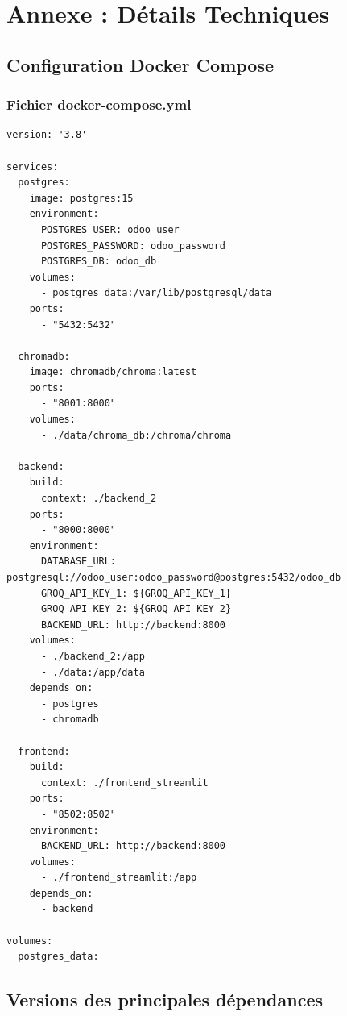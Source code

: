 
\chapter*{Annexe : Détails Techniques}

\section{Configuration Docker Compose}

\subsection{Fichier docker-compose.yml}
\begin{verbatim}
version: '3.8'

services:
  postgres:
    image: postgres:15
    environment:
      POSTGRES_USER: odoo_user
      POSTGRES_PASSWORD: odoo_password
      POSTGRES_DB: odoo_db
    volumes:
      - postgres_data:/var/lib/postgresql/data
    ports:
      - "5432:5432"

  chromadb:
    image: chromadb/chroma:latest
    ports:
      - "8001:8000"
    volumes:
      - ./data/chroma_db:/chroma/chroma

  backend:
    build:
      context: ./backend_2
    ports:
      - "8000:8000"
    environment:
      DATABASE_URL: postgresql://odoo_user:odoo_password@postgres:5432/odoo_db
      GROQ_API_KEY_1: ${GROQ_API_KEY_1}
      GROQ_API_KEY_2: ${GROQ_API_KEY_2}
      BACKEND_URL: http://backend:8000
    volumes:
      - ./backend_2:/app
      - ./data:/app/data
    depends_on:
      - postgres
      - chromadb

  frontend:
    build:
      context: ./frontend_streamlit
    ports:
      - "8502:8502"
    environment:
      BACKEND_URL: http://backend:8000
    volumes:
      - ./frontend_streamlit:/app
    depends_on:
      - backend

volumes:
  postgres_data:
\end{verbatim}

\section{Versions des principales dépendances}

